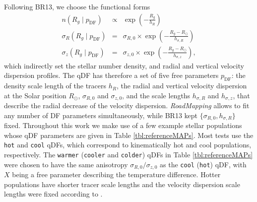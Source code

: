 \documentclass[iop,revtex4,numberedappendix,appendixfloats]{emulateapj}
\newcommand{\RM}{{\sl RoadMapping}}
\begin{document}
Following BR13, we choose the functional forms
\begin{eqnarray}
n(R_g \mid p_\text{DF}) &\propto& \exp\left(-\frac{R_g}{h_R} \right)\\
\sigma_R(R_g \mid p_\text{DF}) &=& \sigma_{R,0} \times \exp\left(- \frac{R_g-R_\odot}{h_{\sigma,R}} \right)\label{eq:sigmaRRg}\\
\sigma_z(R_g \mid p_\text{DF}) &=& \sigma_{z,0} \times \exp\left(- \frac{R_g-R_\odot}{h_{\sigma,z}} \right)\label{eq:sigmazRg},
\end{eqnarray}
which indirectly set the stellar number density, and radial and vertical velocity dispersion profiles. The qDF has therefore a set of five free parameters $p_\text{DF}$: the density scale length of the tracers $h_R$, the radial and vertical velocity dispersion at the Solar position $R_\odot$, $\sigma_{R,0}$ and $\sigma_{z,0}$, and the scale lengths $h_{\sigma,R}$ and $h_{\sigma,z}$, that describe the radial decrease of the velocity dispersion. \RM{} allows to fit any number of DF parameters simultaneously, while BR13 kept $\{\sigma_{R,0},h_{\sigma,R}\}$ fixed. Throughout this work we make use of a few example stellar populations whose qDF parameters are given in Table \ref{tbl:referenceMAPs}. Most tests use the \texttt{hot} and \texttt{cool} qDFs, which correspond to kinematically hot and cool populations, respectively. The \texttt{warmer} (\texttt{cooler} and \texttt{colder}) qDFs in Table \ref{tbl:referenceMAPs} were chosen to have the same anisotropy $\sigma_{R,0}/\sigma_{z,0}$ as the \texttt{cool} (\texttt{hot}) qDF, with $X$ being a free parameter describing the temperature difference. Hotter populations have shorter tracer scale lengths \citep{2012ApJ...753..148B} and the velocity dispersion scale lengths were fixed according to \citet{2012ApJ...755..115B}.
\end{document}

